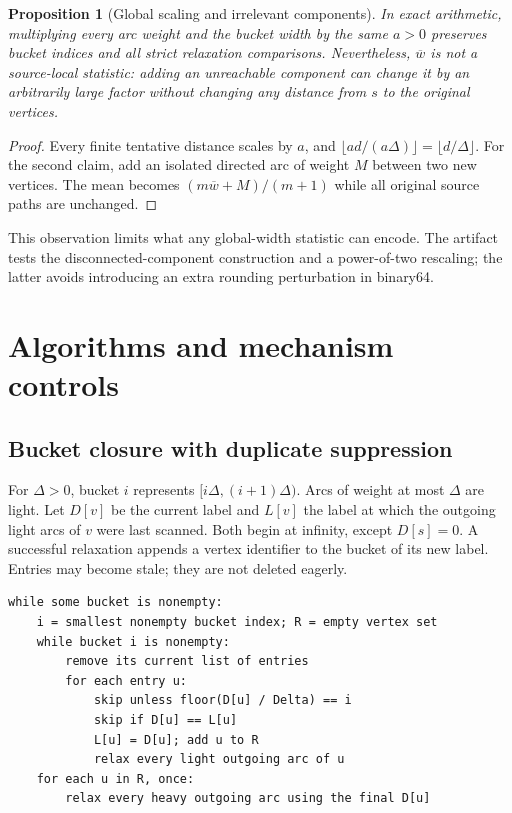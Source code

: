 \documentclass[11pt]{article}
\newtheorem{proposition}{Proposition}
\newcommand{\meanw}{\overline{w}}
\begin{document}
\begin{proposition}[Global scaling and irrelevant components]
In exact arithmetic, multiplying every arc weight and the bucket width by the
same $a>0$ preserves bucket indices and all strict relaxation comparisons.
Nevertheless, $\meanw$ is not a source-local statistic: adding an unreachable
component can change it by an arbitrarily large factor without changing any
distance from $s$ to the original vertices.
\end{proposition}
\begin{proof}
Every finite tentative distance scales by $a$, and
$\lfloor ad/(a\Delta)\rfloor=\lfloor d/\Delta\rfloor$. For the second claim,
add an isolated directed arc of weight $M$ between two new vertices. The mean
becomes $(m\meanw+M)/(m+1)$ while all original source paths are unchanged.
\end{proof}
This observation limits what any global-width statistic can encode. The artifact
tests the disconnected-component construction and a power-of-two rescaling;
the latter avoids introducing an extra rounding perturbation in binary64.

\section{Algorithms and mechanism controls}
\subsection{Bucket closure with duplicate suppression}
For $\Delta>0$, bucket $i$ represents $[i\Delta,(i+1)\Delta)$. Arcs of weight at
most $\Delta$ are light. Let $D[v]$ be the current label and $L[v]$ the label at
which the outgoing light arcs of $v$ were last scanned. Both begin at infinity,
except $D[s]=0$. A successful relaxation appends a vertex identifier to the
bucket of its new label. Entries may become stale; they are not deleted eagerly.

\begin{center}
\begin{minipage}{0.94\linewidth}
\begin{lstlisting}[mathescape=true]
while some bucket is nonempty:
    i = smallest nonempty bucket index; R = empty vertex set
    while bucket i is nonempty:
        remove its current list of entries
        for each entry u:
            skip unless floor(D[u] / Delta) == i
            skip if D[u] == L[u]
            L[u] = D[u]; add u to R
            relax every light outgoing arc of u
    for each u in R, once:
        relax every heavy outgoing arc using the final D[u]
\end{lstlisting}
\end{minipage}
\end{center}
\end{document}
